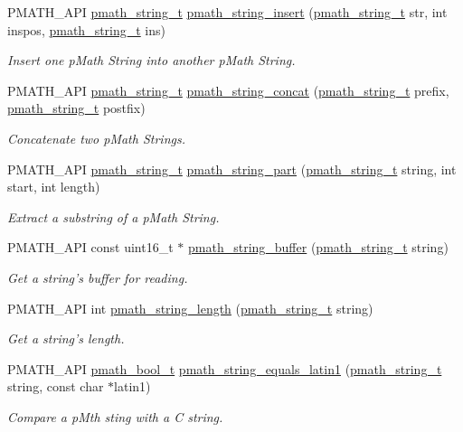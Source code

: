 \begin{CompactItemize}
PMATH\_\-API \hyperlink{classpmath__string__t}{pmath\_\-string\_\-t} \hyperlink{group__strings_g563af717f21793d72933a9914b23a6aa}{pmath\_\-string\_\-insert} (\hyperlink{classpmath__string__t}{pmath\_\-string\_\-t} str, int inspos, \hyperlink{classpmath__string__t}{pmath\_\-string\_\-t} ins)
\begin{CompactList}\small\item\em Insert one pMath String into another pMath String. \item\end{CompactList}\item 
PMATH\_\-API \hyperlink{classpmath__string__t}{pmath\_\-string\_\-t} \hyperlink{group__strings_g2594ada00fefcbede1420bf19b806de6}{pmath\_\-string\_\-concat} (\hyperlink{classpmath__string__t}{pmath\_\-string\_\-t} prefix, \hyperlink{classpmath__string__t}{pmath\_\-string\_\-t} postfix)
\begin{CompactList}\small\item\em Concatenate two pMath Strings. \item\end{CompactList}\item 
PMATH\_\-API \hyperlink{classpmath__string__t}{pmath\_\-string\_\-t} \hyperlink{group__strings_gb99f797d2a7670ff6a44d788d07812cd}{pmath\_\-string\_\-part} (\hyperlink{classpmath__string__t}{pmath\_\-string\_\-t} string, int start, int length)
\begin{CompactList}\small\item\em Extract a substring of a pMath String. \item\end{CompactList}\item 
PMATH\_\-API const uint16\_\-t $\ast$ \hyperlink{group__strings_g381c6abdb25ce421c93c72aa51f33c29}{pmath\_\-string\_\-buffer} (\hyperlink{classpmath__string__t}{pmath\_\-string\_\-t} string)
\begin{CompactList}\small\item\em Get a string's buffer for reading. \item\end{CompactList}\item 
PMATH\_\-API int \hyperlink{group__strings_g4f5ac7eaecd0c7e9916794145938874d}{pmath\_\-string\_\-length} (\hyperlink{classpmath__string__t}{pmath\_\-string\_\-t} string)
\begin{CompactList}\small\item\em Get a string's length. \item\end{CompactList}\item 
PMATH\_\-API \hyperlink{group__general__types_gc92090cb0b56345d6c379ed2341d4ef4}{pmath\_\-bool\_\-t} \hyperlink{group__strings_g710d7a70319d6fa805ddd7ed0ea65365}{pmath\_\-string\_\-equals\_\-latin1} (\hyperlink{classpmath__string__t}{pmath\_\-string\_\-t} string, const char $\ast$latin1)
\begin{CompactList}\small\item\em Compare a pMth sting with a C string. \item\end{CompactList}\end{CompactItemize}
